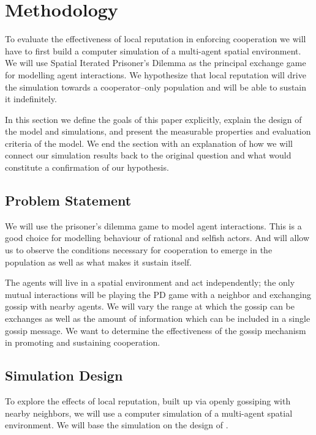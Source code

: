 \documentclass[english]{article}
\begin{document}
\section{Methodology}
To evaluate the effectiveness of local reputation in enforcing cooperation we will have to first build a computer simulation of a multi-agent spatial environment.
We will use Spatial Iterated Prisoner's Dilemma as the principal exchange game for modelling agent interactions.
We hypothesize that local reputation will drive the simulation towards a cooperator--only population and will be able to sustain it indefinitely.

In this section we define the goals of this paper explicitly,
explain the design of the model and simulations,
and present the measurable properties and evaluation criteria of the model.
We end the section with an explanation of how we will connect our simulation results back to the original question
and what would constitute a confirmation of our hypothesis.

\subsection{Problem Statement}
We will use the prisoner's dilemma game to model agent interactions.
This is a good choice for modelling behaviour of rational and selfish actors.
And will allow us to observe the conditions necessary for cooperation to emerge in the population as well as what makes it sustain itself.

The agents will live in a spatial environment and act independently;
the only mutual interactions will be playing the PD game with a neighbor and exchanging gossip with nearby agents.
We will vary the range at which the gossip can be exchanges as well as the amount of information which can be included in a single gossip message.
We want to determine the effectiveness of the gossip mechanism in promoting and sustaining cooperation.

\subsection{Simulation Design}

To explore the effects of local reputation, built up via openly gossiping with nearby neighbors,
we will use a computer simulation of a multi-agent spatial environment.
We will base the simulation on the design of \citet{smaldino}.
\end{document}
